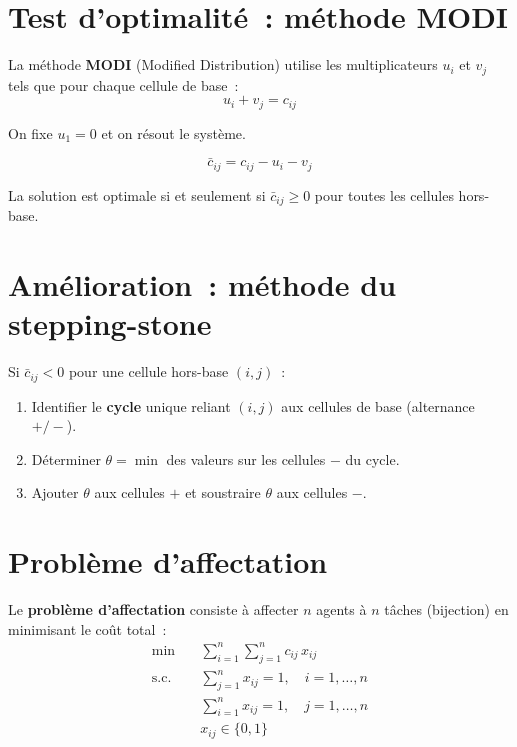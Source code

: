 \section{Test d'optimalit\'e~: m\'ethode MODI}

La m\'ethode \textbf{MODI} (Modified Distribution) utilise les multiplicateurs
$u_i$ et $v_j$ tels que pour chaque cellule de base~:
\[
  u_i + v_j = c_{ij}
\]

On fixe $u_1 = 0$ et on r\'esout le syst\`eme.

\begin{definition}
\[
  \bar{c}_{ij} = c_{ij} - u_i - v_j
\]
\end{definition}

\begin{theoreme}
La solution est optimale si et seulement si $\bar{c}_{ij} \ge 0$ pour
toutes les cellules hors-base.
\end{theoreme}

\section{Am\'elioration~: m\'ethode du stepping-stone}

Si $\bar{c}_{ij} < 0$ pour une cellule hors-base $(i,j)$~:
\begin{enumerate}
  \item Identifier le \textbf{cycle} unique reliant $(i,j)$ aux cellules de
        base (alternance $+/-$).
  \item D\'eterminer $\theta = \min$ des valeurs sur les cellules $-$ du cycle.
  \item Ajouter $\theta$ aux cellules $+$ et soustraire $\theta$ aux cellules $-$.
\end{enumerate}

\section{Probl\`eme d'affectation}

\begin{definition}
Le \textbf{probl\`eme d'affectation} consiste \`a affecter $n$ agents \`a $n$
t\^aches (bijection) en minimisant le co\^ut total~:
\[
\begin{aligned}
  \min \quad & \sum_{i=1}^{n}\sum_{j=1}^{n} c_{ij}\, x_{ij} \\
  \text{s.c.} \quad
    & \sum_{j=1}^{n} x_{ij} = 1, \quad i = 1, \ldots, n \\
    & \sum_{i=1}^{n} x_{ij} = 1, \quad j = 1, \ldots, n \\
    & x_{ij} \in \{0, 1\}
\end{aligned}
\]
\end{definition}

